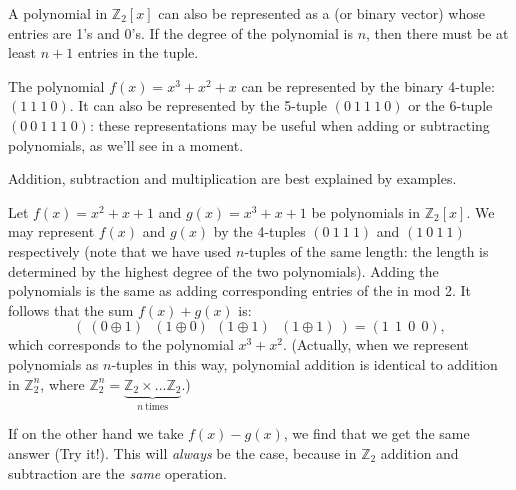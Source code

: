 A polynomial in $\mathbb{Z}_2[x]$ can also be represented as a  (or binary vector) whose entries are 1's and 0's. If the degree of the polynomial is $n$, then there must be at least $n+1$ entries in the tuple.

\begin{example}
The polynomial $f(x) = x^3 + x^2 + x $ can be represented by the binary 4-tuple: $(1~1~1~0)$.  It can also be represented by the 5-tuple $(0~1~1~1~0)$ or the 6-tuple $(0~0~1~1~1~0)$: these representations may be useful when adding or subtracting polynomials, as we'll see in a moment.
\end{example}

Addition, subtraction and multiplication are best explained by examples.

\begin{example}
Let $f(x) = x^2 + x + 1$ and $g(x) = x^3   + x + 1$  be polynomials in $\mathbb{Z}_2[x]$.  We may represent $f(x)$ and $g(x)$  by the 4-tuples $(0~1~1~1)$ and $(1~0~1~1)$ respectively (note that we have used $n$-tuples of the same length: the length is determined by the highest degree of the two polynomials). Adding the polynomials is the same as adding corresponding entries of the in mod 2. It follows that the sum $f(x)+g(x)$ is:
\[\left( ~(0\oplus 1)~~~(1\oplus 0)~~(1 \oplus 1)~~~(1 \oplus 1)~\right) = (1~~1~~0~~0), \]
which corresponds to the polynomial $x^3   + x^2$. (Actually, when we represent polynomials as $n$-tuples in this way, polynomial addition is identical to addition in $\mathbb{Z}_2^n$, where $\mathbb{Z}_2^n = \underbrace{\mathbb{Z}_2 \times \ldots \mathbb{Z}_2}_{n~\text{times}}$.)

If on the other hand we take $f(x) - g(x)$, we find that we get the same answer (Try it!). This will \emph{always} be the case, because in $\mathbb{Z}_2$ addition and subtraction are the \emph{same} operation. 


\end{example}


